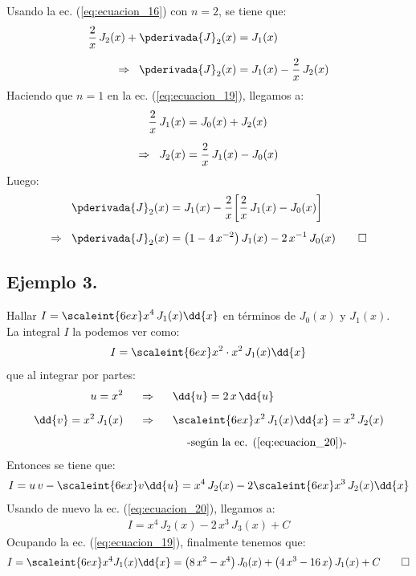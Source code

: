 Usando la ec. (\ref{eq:ecuacion_16}) con $n = 2$, se tiene que:
\begin{align*}
\dfrac{2}{x} \, J_{2}(x) + \pderivada{J}_{2}(x) &= J_{1}(x) \\[0.5em]
\Rightarrow \hspace{0.2cm} \pderivada{J}_{2}(x) &= {J}_{1} (x) - \dfrac{2}{x} \, J_{2}(x)
\end{align*}
Haciendo que $n = 1$ en la ec. (\ref{eq:ecuacion_19}), llegamos a:
\begin{align*}
\dfrac{2}{x} \, J_{1}(x) &= J_{0} (x) + J_{2}(x) \\[0.5em]
\Rightarrow \hspace{0.2cm} J_{2}(x) &= \dfrac{2}{x} \, J_{1}(x) - J_{0}(x)
\end{align*}
Luego:
\begin{align*}
\pderivada{J}_{2}(x) &= J_{1}(x) - \dfrac{2}{x} \bigg[ \dfrac{2}{x} \, J_{1}(x) - J_{0}(x) \bigg] \\[0.5em]
\Rightarrow \hspace{0.2cm} \pderivada{J}_{2} (x) &= \big( 1 - 4 \, x^{-2} \big) \, J_{1}(x) - 2 \, x^{-1} \, J_{0}(x) \qed
\end{align*}

\subsection{Ejemplo 3.}

\noindent
Hallar $I = \displaystyle \scaleint{6ex} x^{4} \, J_{1}(x) \dd{x}$ en términos de $J_{0}(x)$ y $J_{1}(x)$.
\\[0.5em]
La integral $I$ la podemos ver como:
\begin{align*}
I = \scaleint{6ex} x^{2} \cdot x^{2} \, J_{1}(x) \dd{x}
\end{align*}
que al integrar por partes:
\begin{align*}
u = x^{2} \hspace{0.5cm} &\Rightarrow \hspace{0.5cm} \dd{u} = 2\, x \, \dd{u} \\[0.5em]
\dd{v} = x^{2} \, J_{1} (x) \hspace{0.5cm} &\Rightarrow \hspace{0.5cm} \scaleint{6ex} x^{2} \, J_{1}(x) \dd{x} = x^{2} \, J_{2}(x) \\[0.5em]
 & \hspace{1.5cm} \mbox{-según la ec. (\ref{eq:ecuacion_20})-}
\end{align*}
Entonces se tiene que:
\begin{align*}
I = u \, v - \scaleint{6ex} v \dd{u} = x^{4} \, J_{2}(x) - 2 \scaleint{6ex} x^{3} \, J_{2} (x) \dd{x}
\end{align*}
Usando de nuevo la ec. (\ref{eq:ecuacion_20}), llegamos a:
\begin{align*}
I = x^{4} \, J_{2}(x) - 2 \, x^{3} \, J_{3}(x) + C
\end{align*}
Ocupando la ec. (\ref{eq:ecuacion_19}), finalmente tenemos que:
\begin{align*}
I = \scaleint{6ex} x^{4} J_{1}(x) \dd{x} = \big( 8 \, x^{2} - x^{4} \big) \, J_{0} (x) + \big( 4 \, x^{3} - 16 \, x \big) \, J_{1}(x) + C \qed
\end{align*}


